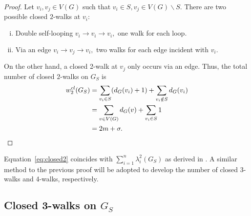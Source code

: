 \documentclass[12pt,a4paper,reqno]{amsart}
\numberwithin{equation}{section}
\theoremstyle{plain}
\theoremstyle{definition}
\newcommand{\<}{\langle}
\renewcommand{\>}{\rangle}
\begin{document}
\begin{proof}
Let $v_i,v_j \in V(G)$ such that $v_i\in S, v_j \in V(G) \backslash S.$ %
There are two possible closed $2$-walks at $v_i$: 
\begin{enumerate}[(i)]
\item Double self-looping $v_i \to v_i \to v_i,$ one walk for each loop.
\item Via an edge $v_i \to v_j \to v_i,$ two walks for each edge incident with $v_i.$  
\end{enumerate}
On the other hand, a closed 2-walk at $v_j$ only occurs via an edge. 
Thus, the total number of closed $2$-walks on $G_S$ is
\begin{align*}
w_2^{cl}(G_S)
&=\sum_{v_i \in S} (d_G(v_i)+1) + \sum_{v_i \notin S} d_G(v_i)  \\
&= \sum_{v\in V(G)} d_G(v) + \sum_{v_i\in S} 1 \\
&= 2m + \sigma. \qedhere
\end{align*}
\end{proof}


Equation~\ref{eq:closed2} coincides with  
$\sum^n_{i=1} \lambda^2_i(G_S)$ as derived in \cite[Lemma 4]{gutman2021energy}.
A similar method to the previous proof will be adopted to develop the number of closed 3-walks and 4-walks, respectively.
\subsection{Closed 3-walks on $G_S$} 
\end{document}
